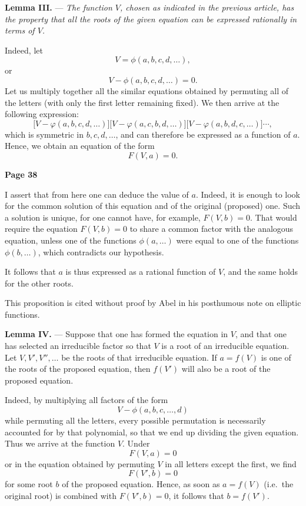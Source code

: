 \documentclass{article}
\begin{document}
\medskip

\textbf{Lemma III.} --- \textit{The function \(V\), chosen as indicated in the previous article, has the property that all the roots of the given equation can be expressed rationally in terms of \(V\).}

\smallskip

Indeed, let
\[
V = \phi(a, b, c, d, \dots),
\]
or
\[
V - \phi(a, b, c, d, \dots) = 0.
\]
Let us multiply together all the similar equations obtained by permuting 
all of the letters (with only the first letter remaining fixed). We then arrive 
at the following expression:
\[
\bigl[V - \varphi(a, b, c, d,\dots)\bigr]
\bigl[V - \varphi(a, c, b, d,\dots)\bigr]
\bigl[V - \varphi(a, b, d, c,\dots)\bigr]
\cdots,
\]
which is symmetric in $b, c, d,\dots$, and can therefore be expressed 
as a function of $a$. Hence, we obtain an equation of the form
\[
F(V, a) = 0.
\]

\newpage


\centerline{\textbf{Page 38}}

\medskip

\noindent
I assert that from here one can deduce the value of \(a\). Indeed, it is enough to look for the common solution of this equation and of the original (proposed) one. Such a solution is unique, for one cannot have, for example, \(F(V, b) = 0\). That would require the equation \(F(V, b) = 0\) to share a common factor with the analogous equation, unless one of the functions \(\phi(a, \dots)\) were equal to one of the functions \(\phi(b, \dots)\), which contradicts our hypothesis.

It follows that \(a\) is thus expressed as a rational function of \(V\), and the same holds for the other roots. 

This proposition is cited without proof by Abel in his posthumous note on elliptic functions.

\medskip

\noindent
\textbf{Lemma IV.} --- Suppose that one has formed the equation in \(V\), and that one has selected an irreducible factor so that \(V\) is a root of an irreducible equation. Let \(V, V', V'', \dots\) be the roots of that irreducible equation. If \(a = f(V)\) is one of the roots of the proposed equation, then \(f(V')\) will also be a root of the proposed equation.

\smallskip

\noindent
Indeed, by multiplying all factors of the form
\[
V - \phi(a, b, c, \dots, d)
\]
while permuting all the letters, every possible permutation is necessarily accounted for by that polynomial, so that we end up dividing the given equation. Thus we arrive at the function \(V\). Under
\[
F(V, a) = 0
\]
or in the equation obtained by permuting \(V\) in all letters except the first, we find
\[
F(V', b) = 0
\]
for some root \(b\) of the proposed equation. Hence, as soon as \(a = f(V)\) (i.e.\ the original root) is combined with \(F(V', b) = 0\), it follows that \(b = f(V')\).
\end{document}
